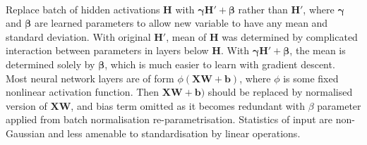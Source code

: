 \begin{remark} \\
Replace batch of hidden activations $\bm{H}$ with $\bm{\gamma} \bm{H}' + \bm{\beta}$ rather than $\bm{H}'$, where $\bm{\gamma}$ and $\bm{\beta}$ are learned parameters to allow new variable to have any mean and standard deviation. With original $\bm{H}'$, mean of $\bm{H}$ was determined by complicated interaction between parameters in layers below $\bm{H}$. With $\bm{\gamma} \bm{H}' + \bm{\beta}$, the mean is determined solely by $\bm{\beta}$, which is much easier to learn with gradient descent.\\
Most neural network layers are of form $\phi(\bm{X} \bm{W} + \bm{b})$, where $\phi$ is some fixed nonlinear activation function. Then $\bm{X} \bm{W} + \bm{b})$ should be replaced by normalised version of $\bm{X} \bm{W}$, and bias term omitted as it becomes redundant with $\beta$ parameter applied from batch normalisation re-parametrisation. Statistics of input are non-Gaussian and less amenable to standardisation by linear operations.
\end{remark}

\begin{remark} \\
	
\end{remark}
